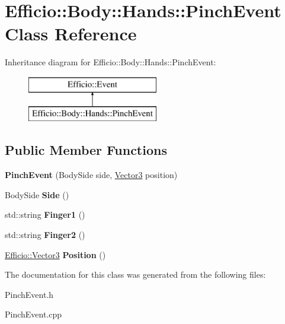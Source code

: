 \hypertarget{class_efficio_1_1_body_1_1_hands_1_1_pinch_event}{}\section{Efficio\+:\+:Body\+:\+:Hands\+:\+:Pinch\+Event Class Reference}
\label{class_efficio_1_1_body_1_1_hands_1_1_pinch_event}
Inheritance diagram for Efficio\+:\+:Body\+:\+:Hands\+:\+:Pinch\+Event\+:\begin{figure}[H]
\begin{center}
\leavevmode
\includegraphics[height=2.000000cm]{class_efficio_1_1_body_1_1_hands_1_1_pinch_event}
\end{center}
\end{figure}
\subsection*{Public Member Functions}
\begin{DoxyCompactItemize}
\item 
{\bfseries Pinch\+Event} (Body\+Side side, \hyperlink{class_efficio_1_1_vector3}{Vector3} position)\hypertarget{class_efficio_1_1_body_1_1_hands_1_1_pinch_event_a9343a804d70ebbf9eef81fbaa7bf6e0f}{}\label{class_efficio_1_1_body_1_1_hands_1_1_pinch_event_a9343a804d70ebbf9eef81fbaa7bf6e0f}

\item 
Body\+Side {\bfseries Side} ()\hypertarget{class_efficio_1_1_body_1_1_hands_1_1_pinch_event_a0893608fbb54aeb771d362a742ac9407}{}\label{class_efficio_1_1_body_1_1_hands_1_1_pinch_event_a0893608fbb54aeb771d362a742ac9407}

\item 
std\+::string {\bfseries Finger1} ()\hypertarget{class_efficio_1_1_body_1_1_hands_1_1_pinch_event_a987c01066ba124ac85e980f873221431}{}\label{class_efficio_1_1_body_1_1_hands_1_1_pinch_event_a987c01066ba124ac85e980f873221431}

\item 
std\+::string {\bfseries Finger2} ()\hypertarget{class_efficio_1_1_body_1_1_hands_1_1_pinch_event_a5753885684607d488120bb3dad2a54ac}{}\label{class_efficio_1_1_body_1_1_hands_1_1_pinch_event_a5753885684607d488120bb3dad2a54ac}

\item 
\hyperlink{class_efficio_1_1_vector3}{Efficio\+::\+Vector3} {\bfseries Position} ()\hypertarget{class_efficio_1_1_body_1_1_hands_1_1_pinch_event_a3f7f93b716af33b5554e92ef02645a2b}{}\label{class_efficio_1_1_body_1_1_hands_1_1_pinch_event_a3f7f93b716af33b5554e92ef02645a2b}

\end{DoxyCompactItemize}


The documentation for this class was generated from the following files\+:\begin{DoxyCompactItemize}
\item 
Pinch\+Event.\+h\item 
Pinch\+Event.\+cpp\end{DoxyCompactItemize}

